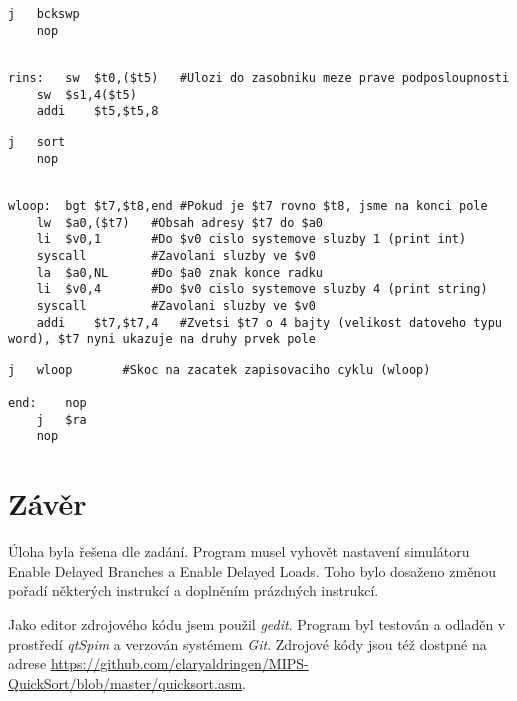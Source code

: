 \documentclass[11pt, titlepage]{article}
\begin{document}
\begin{lstlisting}[backgroundcolor=\color{Red}]   
	j	bckswp
	nop
\end{lstlisting}
\begin{lstlisting}

rins:	sw	$t0,($t5)	#Ulozi do zasobniku meze prave podposloupnosti 
	sw	$s1,4($t5)
	addi	$t5,$t5,8
\end{lstlisting}
\begin{lstlisting}[backgroundcolor=\color{Red}]   
	j	sort
	nop
\end{lstlisting}
\begin{lstlisting}

wloop:	bgt	$t7,$t8,end	#Pokud je $t7 rovno $t8, jsme na konci pole
	lw	$a0,($t7)	#Obsah adresy $t7 do $a0
	li	$v0,1		#Do $v0 cislo systemove sluzby 1 (print int)
	syscall			#Zavolani sluzby ve $v0
	la	$a0,NL		#Do $a0 znak konce radku
	li	$v0,4		#Do $v0 cislo systemove sluzby 4 (print string)
	syscall			#Zavolani sluzby ve $v0
	addi	$t7,$t7,4	#Zvetsi $t7 o 4 bajty (velikost datoveho typu word), $t7 nyni ukazuje na druhy prvek pole
\end{lstlisting}
\begin{lstlisting}[backgroundcolor=\color{Red}]   
	j	wloop		#Skoc na zacatek zapisovaciho cyklu (wloop)

end:	nop
	j	$ra
	nop
\end{lstlisting}

\section{Závěr}

Úloha byla řešena dle zadání. Program musel vyhovět nastavení simulátoru Enable Delayed Branches a Enable Delayed Loads. Toho bylo dosaženo změnou pořadí některých instrukcí a doplněním prázdných instrukcí.

Jako editor zdrojového kódu jsem použil \textit{gedit}. Program byl testován a odladěn v prostředí \textit{qtSpim} a verzován systémem \textit{Git}. Zdrojové kódy jsou též dostpné na adrese \url{https://github.com/claryaldringen/MIPS-QuickSort/blob/master/quicksort.asm}.
\end{document}
